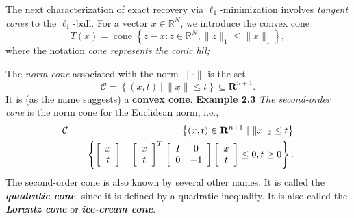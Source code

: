 The next characterization of exact recovery via $\ell_1$-minimization involves \emph{\textcolor[rgb]{1,0,0}{tangent cones}} to the $\ell_1$-ball. For a vector $x \in \mathbb{R}^N$, we introduce the convex cone
\begin{equation}
    T(x) = \mathop{\mathrm{cone}}\left\{ z-x : z\in \mathbb{R}^N, \|z\|_1 \leq \|x\|_1 \right\},
    \label{eq0.4.34}
\end{equation}
where the notation \emph{\textcolor[rgb]{1,0,0}{cone represents the conic hll;}}
\begin{mdframed}
    \label{cone}
    The \emph{\textcolor[rgb]{1,0,0}{norm cone}} associated with the norm $\|\cdot\|$ is the set 
    \[
        \mathcal{C} = \left\{ (x,t) \  | \  \|x\| \leq t \right\} \subseteq \mathbf{R}^{n+1}.
    \]
    It is (as the name suggests) a \textbf{\textcolor[rgb]{1,0,0}{convex cone}}.
    \textbf{Example 2.3} \emph{The second-order cone} is the norm cone for the Euclidean norm, i.e.,
    \begin{eqnarray*}
        \mathcal{C} &=&  \left\{ (x,t) \in \mathbf{R}^{n+1} \ | \ \|x\|_2 \leq t \right\} \\
        &=& \left\{ \left[ 
            \begin{array}[]{c}
                x \\
                t
            \end{array}
        \right] \ \left| \ \left[ 
            \begin{array}[]{c}
                x \\
                t
            \end{array}
        \right]^T \right. 
        \left[ 
            \begin{array}[]{cc}
                I & 0 \\
                0 & -1
            \end{array}
        \right]
        \left[ 
            \begin{array}[]{c}
                x \\
                t
            \end{array}
        \right]
        \leq 0, t \geq 0
    \right\}.
    \end{eqnarray*}
    The second-order cone is also known by several other names. It is called the \emph{\textbf{\textcolor[rgb]{1,0,0}{quadratic cone}}}, since it is defined by a quadratic inequality. It is also called the \emph{\textbf{\textcolor[rgb]{1,0,0}{Lorentz cone}}} or \emph{\textbf{\textcolor[rgb]{1,0,0}{ice-cream cone}}}. 
\end{mdframed}

